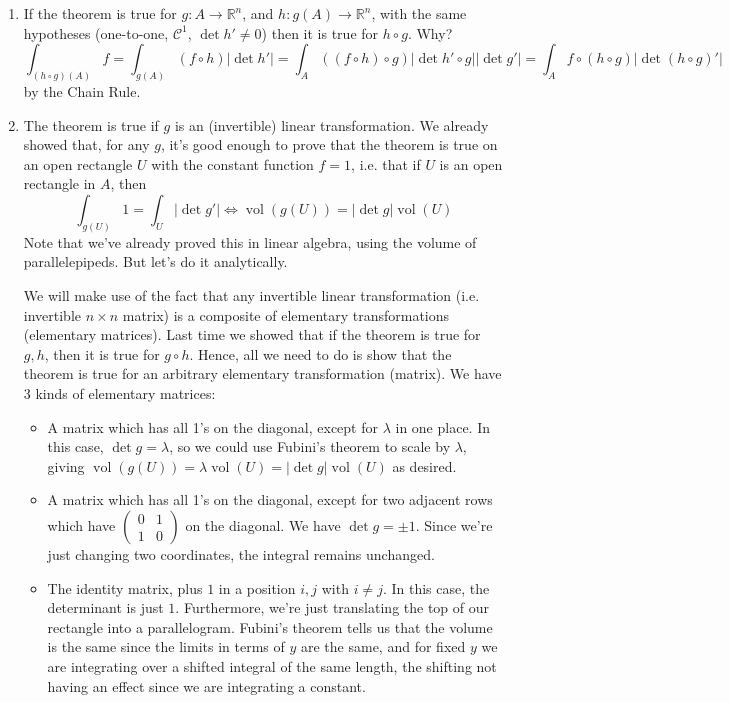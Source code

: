 \documentclass{article}
\DeclareMathOperator{\Vol}{vol}
\newcommand{\reals}[0]{\mathbb{R}}
\newcommand{\mc}[1]{\mathcal{#1}}
\begin{document}
\begin{enumerate}
  \item If the theorem is true for \(g : A \to \reals^n\), and \(h: g(A) \to \reals^n\), with the same hypotheses (one-to-one, \(\mc{C}^1\), \(\det h' \neq 0\)) then it is true for \(h \circ g\). Why?
  \begin{equation}
    \int_{(h \circ g)(A)}f = \int_{g(A)}(f \circ h)|\det h'| = \int_A((f \circ h) \circ g)|\det h' \circ g||\det g'| = \int_Af \circ (h \circ g)|\det (h \circ g)'|
  \end{equation}
  by the Chain Rule.
  \label{proof:cov_p3}


  \item The theorem is true if \(g\) is an (invertible) linear transformation. We already showed that, for any \(g\), it's good enough to prove that the theorem is true on an open rectangle \(U\) with the constant function \(f = 1\), i.e. that if \(U\) is an open rectangle in \(A\), then
  \begin{equation}
    \int_{g(U)}1 = \int_U|\det g'| \iff \Vol(g(U)) = |\det g|\Vol(U)
  \end{equation}
  Note that we've already proved this in linear algebra, using the volume of parallelepipeds. But let's do it analytically.

  We will make use of the fact that any invertible linear transformation (i.e. invertible \(n \times n\) matrix) is a composite of elementary transformations (elementary matrices). Last time we showed that if the theorem is true for \(g, h\), then it is true for \(g \circ h\). Hence, all we need to do is show that the theorem is true for an arbitrary elementary transformation (matrix). We have 3 kinds of elementary matrices:
  \begin{itemize}

    \item A matrix which has all 1's on the diagonal, except for \(\lambda\) in one place. In this case, \(\det g = \lambda\), so we could use Fubini's theorem to scale by \(\lambda\), giving \(\Vol(g(U)) = \lambda \Vol(U) = |\det g|\Vol(U)\) as desired.

    \item A matrix which has all 1's on the diagonal, except for two adjacent rows which have \(\begin{pmatrix} 0 & 1 \\ 1 & 0 \end{pmatrix}\) on the diagonal. We have \(\det g = \pm 1\). Since we're just changing two coordinates, the integral remains unchanged.

    \item The identity matrix, plus \(1\) in a position \(i, j\) with \(i \neq j\). In this case, the determinant is just \(1\). Furthermore, we're just translating the top of our rectangle into a parallelogram. Fubini's theorem tells us that the volume is the same since the limits in terms of \(y\) are the same, and for fixed \(y\) we are integrating over a shifted integral of the same length, the shifting not having an effect since we are integrating a constant.

  \end{itemize}
  \label{proof:cov_p4}


\end{enumerate}
\end{document}
